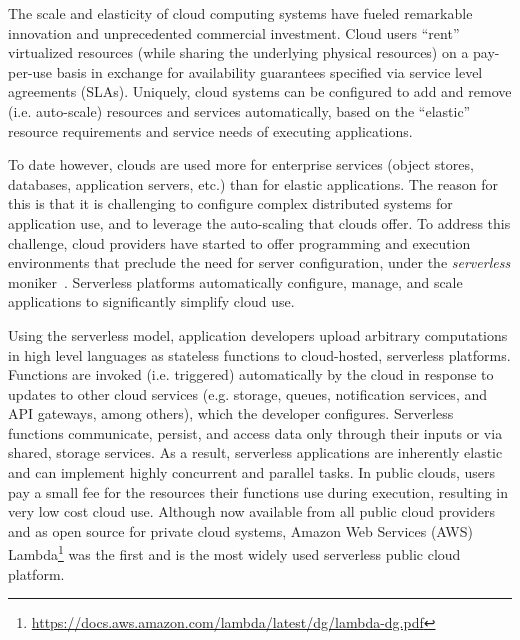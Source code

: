 The scale and elasticity of cloud computing systems have 
fueled remarkable innovation and unprecedented commercial 
investment.  Cloud users ``rent'' virtualized resources (while sharing
the underlying physical resources) on a pay-per-use basis
in exchange for availability guarantees specified via service level
agreements (SLAs). Uniquely, cloud systems can be configured 
to add and remove (i.e. auto-scale) resources and services
automatically, based on the ``elastic'' resource requirements and service needs 
of executing applications.

To date however, clouds are used more for
enterprise services (object stores, databases, application servers, etc.)
than for elastic applications.
The reason for this is that it is challenging to configure complex
distributed systems for application use, 
and to leverage the auto-scaling that
clouds offer. To address this challenge, cloud providers 
have started to offer programming and execution environments
that preclude the need for server configuration,
under the \textit{serverless} moniker~\cite{ref:jonas2017occupy,ref:onesteptwostep,ref:peeking}.  
Serverless platforms automatically configure, manage, and scale applications
to significantly simplify cloud use.

Using the serverless model, application developers upload 
arbitrary computations in high level languages
as stateless functions to cloud-hosted, serverless platforms.
Functions are invoked (i.e. triggered)
automatically by the cloud in response to updates to other cloud services
(e.g. storage, queues, notification services, and API gateways, among others), which 
the developer configures. Serverless functions
communicate, persist, and access data only 
through their inputs or via shared, storage services.  
As a result, serverless applications are inherently elastic and can 
implement highly concurrent and parallel tasks.
In public clouds, users pay a small fee for the resources their 
functions use during execution, resulting in very low cost cloud use.
Although now available from all public cloud providers and as open 
source for private cloud systems, 
Amazon Web Services (AWS) Lambda\footnote{\url{https://docs.aws.amazon.com/lambda/latest/dg/lambda-dg.pdf}} %
was the first and is the most widely used
serverless public cloud platform.

